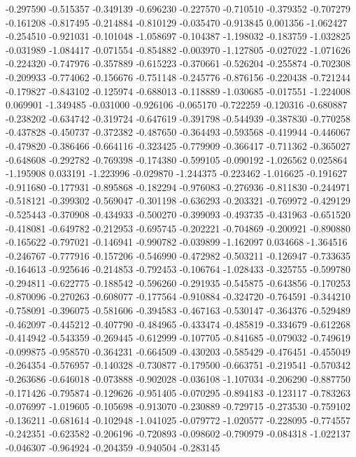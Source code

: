 -0.297590
-0.515357
-0.349139
-0.696230
-0.227570
-0.710510
-0.379352
-0.707279
-0.161208
-0.817495
-0.214884
-0.810129
-0.035470
-0.913845
0.001356
-1.062427
-0.254510
-0.921031
-0.101048
-1.058697
-0.104387
-1.198032
-0.183759
-1.032825
-0.031989
-1.084417
-0.071554
-0.854882
-0.003970
-1.127805
-0.027022
-1.071626
-0.224320
-0.747976
-0.357889
-0.615223
-0.370661
-0.526204
-0.255874
-0.702308
-0.209933
-0.774062
-0.156676
-0.751148
-0.245776
-0.876156
-0.220438
-0.721244
-0.179827
-0.843102
-0.125974
-0.688013
-0.118889
-1.030685
-0.017551
-1.224008
0.069901
-1.349485
-0.031000
-0.926106
-0.065170
-0.722259
-0.120316
-0.680887
-0.238202
-0.634742
-0.319724
-0.647619
-0.391798
-0.544939
-0.387830
-0.770258
-0.437828
-0.450737
-0.372382
-0.487650
-0.364493
-0.593568
-0.419944
-0.446067
-0.479820
-0.386466
-0.664116
-0.323425
-0.779909
-0.366417
-0.711362
-0.365027
-0.648608
-0.292782
-0.769398
-0.174380
-0.599105
-0.090192
-1.026562
0.025864
-1.195908
0.033191
-1.223996
-0.029870
-1.244375
-0.223462
-1.016625
-0.191627
-0.911680
-0.177931
-0.895868
-0.182294
-0.976083
-0.276936
-0.811830
-0.244971
-0.518121
-0.399302
-0.569047
-0.301198
-0.636293
-0.203321
-0.769972
-0.429129
-0.525443
-0.370908
-0.434933
-0.500270
-0.399093
-0.493735
-0.431963
-0.651520
-0.418081
-0.649782
-0.212953
-0.695745
-0.202221
-0.704869
-0.200921
-0.890880
-0.165622
-0.797021
-0.146941
-0.990782
-0.039899
-1.162097
0.034668
-1.364516
-0.246767
-0.777916
-0.157206
-0.546990
-0.472982
-0.503211
-0.126947
-0.733635
-0.164613
-0.925646
-0.214853
-0.792453
-0.106764
-1.028433
-0.325755
-0.599780
-0.294811
-0.622775
-0.188542
-0.596260
-0.291935
-0.545875
-0.643856
-0.170253
-0.870096
-0.270263
-0.608077
-0.177564
-0.910884
-0.324720
-0.764591
-0.344210
-0.758091
-0.396075
-0.581606
-0.394583
-0.467163
-0.530147
-0.364376
-0.529489
-0.462097
-0.445212
-0.407790
-0.484965
-0.433474
-0.485819
-0.334679
-0.612268
-0.414942
-0.543359
-0.269445
-0.612999
-0.107705
-0.841685
-0.079032
-0.749619
-0.099875
-0.958570
-0.364231
-0.664509
-0.430203
-0.585429
-0.476451
-0.455049
-0.264354
-0.576957
-0.140328
-0.730877
-0.179500
-0.663751
-0.219541
-0.570342
-0.263686
-0.646018
-0.073888
-0.902028
-0.036108
-1.107034
-0.206290
-0.887750
-0.171426
-0.795874
-0.129626
-0.951405
-0.070295
-0.894183
-0.123117
-0.783263
-0.076997
-1.019605
-0.105698
-0.913070
-0.230889
-0.729715
-0.273530
-0.759102
-0.136211
-0.681614
-0.102948
-1.041025
-0.079772
-1.020577
-0.228095
-0.774557
-0.242351
-0.623582
-0.206196
-0.720893
-0.098602
-0.790979
-0.084318
-1.022137
-0.046307
-0.964924
-0.204359
-0.940504
-0.283145
